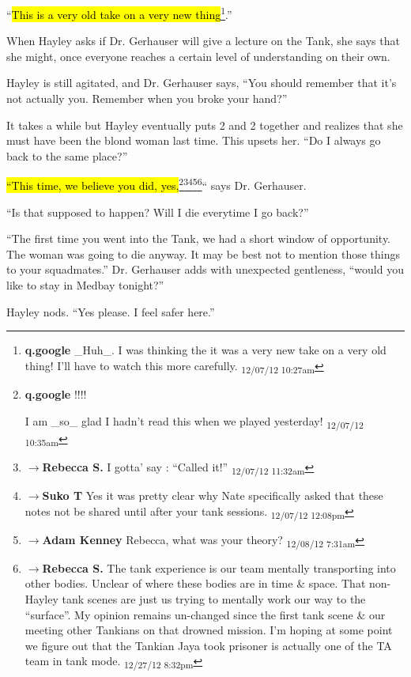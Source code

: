 ``\hl{This is a very old take on a very new thing}\footnote{\textbf{q.google }\_Huh\_.  I was thinking the it was a very new take on a very old thing!  I'll have to watch this more carefully. \textsubscript{12/07/12 10:27am}}.''

When Hayley asks if Dr. Gerhauser will give a lecture on the Tank, she says that she might, once everyone reaches a certain level of understanding on their own.





Hayley is still agitated, and Dr. Gerhauser says, ``You should remember that it's not actually you.  Remember when you broke your hand?''

It takes a while but Hayley eventually puts 2 and 2 together and realizes that she must have been the blond woman last time.  This upsets her.  ``Do I always go back to the same place?''

\hl{``This time, we believe you did, yes,}\footnote{\textbf{q.google }!!!!

I am \_so\_ glad I hadn't read this when we played yesterday! \textsubscript{12/07/12 10:35am}}\footnote{$\rightarrow$\textbf{Rebecca S. }I gotta' say : ``Called it!'' \textsubscript{12/07/12 11:32am}}\footnote{$\rightarrow$\textbf{Suko T }Yes it was pretty clear why Nate specifically asked that these notes not be shared until after your tank sessions. \textsubscript{12/07/12 12:08pm}}\footnote{$\rightarrow$\textbf{Adam Kenney }Rebecca, what was your theory? \textsubscript{12/08/12 7:31am}}\footnote{$\rightarrow$\textbf{Rebecca S. }The tank experience is our team mentally transporting into other bodies. Unclear of where these bodies are in time \& space.  That non-Hayley tank scenes are just us trying to mentally work our way to the ``surface''.  My opinion remains un-changed since the first tank scene \& our meeting other Tankians on that drowned mission.  I'm hoping at some point we figure out that the Tankian Jaya took prisoner is actually one of the TA team in tank mode. \textsubscript{12/27/12 8:32pm}}`` says Dr. Gerhauser.

``Is that supposed to happen?  Will I die everytime I go back?''

``The first time you went into the Tank, we had a short window of opportunity.  The woman was going to die anyway.  It may be best not to mention those things to your squadmates.''  Dr. Gerhauser adds with unexpected gentleness, ``would you like to stay in Medbay tonight?''

Hayley nods.  ``Yes please.  I feel safer here.'' 

